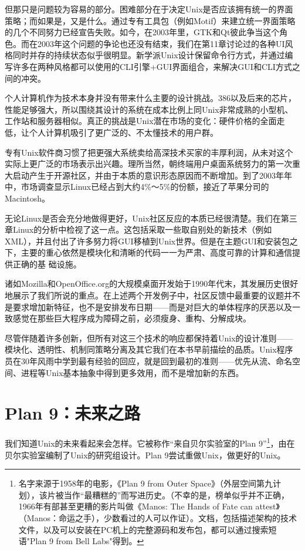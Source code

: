 \documentclass[12pt,oneside]{ctexbook}
\begin{document}
\begin{common-format}
但那只是问题较为容易的部分。困难部分在于决定Unix是否应该拥有统一的界面策略；而如果是，又是什么。通过专有工具包（例如Motif）来建立统一界面策略的几个不同努力已经宣告失败。如今，在2003年里，GTK和Qt彼此争当这个角色。而在2003年这个问题的争论也还没有结束，我们在第11章讨论过的各种UI风格同时并存的持续状态似乎很明显。新学派Unix设计保留命令行方式，并通过编写许多在两种风格都可以使用的CLI引擎+GUI界面组合，来解决GUI和CLI方式之间的冲突。

个人计算机作为技术本身并没有带来什么主要的设计挑战。386以及后来的芯片，性能足够强大，所以围绕其设计的系统在成本比例上同Unix非常成熟的小型机、工作站和服务器相似。真正的挑战是Unix潜在市场的变化：硬件价格的全面走低，让个人计算机吸引了更广泛的、不太懂技术的用户群。

专有Unix软件商习惯了把更强大系统卖给高深技术买家的丰厚利润，从未对这个实际上更广泛的市场表示出兴趣。理所当然，朝终端用户桌面系统努力的第一次重大启动产生于开源社区，并由于本质的意识形态原因而不断增加。到了2003年年中，市场调查显示Linux已经占到大约4\%{}～5\%{}的份额，接近了苹果分司的Macintosh。

无论Linux是否会充分地做得更好，Unix社区反应的本质已经很清楚。我们在第三章Linux的分析中检视了这一点。这包括采取一些取自别处的新技术（例如XML），并且付出了许多努力将GUI移植到Unix世界。但是在主题GUI和安装包之下，主要的重心依然是模块化和清晰的代码一一为严肃、高度可靠的计算和通信提供正确的基
础设施。

诸如Mozilla和OpenOffice.org的大规模桌面开发始于1990年代末，其发展历史很好地展示了我们所说的重点。在上述两个开发例子中，社区反馈中最重要的议题并不是要求增加新特征，也不是安排发布日期——而是对巨大的单体程序的厌恶以及一致感觉在那些巨大程序成为障碍之前，必须瘦身、重构、分解成块。

尽管伴随着许多创新，但所有对这三个技术的响应都保持着Unix的设计准则——模块化、透明性、机制同策略分离及其它我们在本书早前描绘的品质。Unix程序员在30年风雨中学到最有经验的回应，就是回到最初的准则——优先从流、命名空间、进程等Unix基本抽象中得到更多效用，而不是增加新的东西。

\section{Plan 9：未来之路}
我们知道Unix的未来看起来会怎样。它被称作“来自贝尔实验室的Plan 9”\footnote{名字来源于1958年的电影，《Plan 9 from Outer Space》（外层空间第九计划），该片被当作“最糟糕的”而写进历史。（不幸的是，榜单似乎并不正确，1966年有部甚至更糟的影片叫做《Manos: The Hands of Fate can attest》（Manos：命运之手），少数看过的人可以作证）。文档，包括描述架构的技术文件，以及可以安装在PC机上的完整源码和发布包，都可以通过搜索短语"Plan 9 from Bell Labs"得到。}，由在贝尔实验室编制了Unix的研究组设计。Plan 9尝试重做Unix，做更好的Unix。


\end{common-format}
\end{document}
